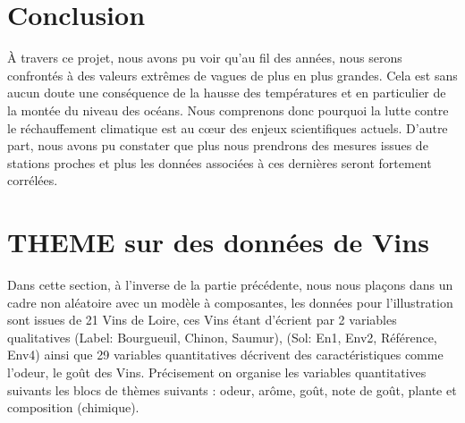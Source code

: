 \documentclass[a4paper,french,10pt]{article}
\begin{document}
\newpage

\section{Conclusion}
À travers ce projet, nous avons pu voir qu'au fil des années, nous serons confrontés à des valeurs extrêmes de vagues de plus en plus grandes. Cela est sans aucun doute une conséquence de la hausse des températures et en particulier de la montée du niveau des océans. Nous comprenons donc pourquoi la lutte contre le réchauffement climatique est au cœur des enjeux scientifiques actuels. D'autre part, nous avons pu constater que plus nous prendrons des mesures issues de stations proches et plus les données associées à ces dernières seront fortement corrélées. 


\newpage


\section{THEME sur des données de Vins}

Dans cette section, à l'inverse de la partie précédente, nous nous plaçons dans un cadre non aléatoire avec un modèle à composantes, les données pour l'illustration sont issues de 21 Vins de Loire, ces Vins étant d'écrient par 2 variables qualitatives (Label: Bourgueuil, Chinon, Saumur), (Sol: En1, Env2, Référence, Env4) ainsi que 29 variables quantitatives décrivent des
caractéristiques comme l’odeur, le goût des Vins. \newline
Précisement on organise les variables quantitatives suivants les blocs de thèmes suivants : odeur, arôme, goût, note de goût, plante et composition (chimique).\newline
\end{document}
